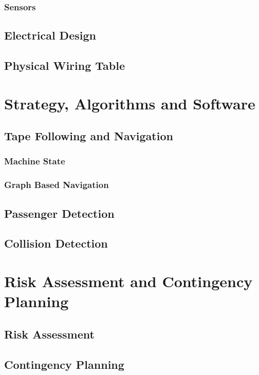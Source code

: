 \documentclass[12pt]{article}
\begin{document}
\subsubsection{Sensors}
\subsection{Electrical Design}
\subsection{Physical Wiring Table}

\section{Strategy, Algorithms and Software}
\subsection{Tape Following and Navigation}
\subsubsection{Machine State}
\subsubsection{Graph Based Navigation}
\subsection{Passenger Detection}
\subsection{Collision Detection}

\section{Risk Assessment and Contingency Planning}
\subsection{Risk Assessment}
\subsection{Contingency Planning}
\hspace*{-5pt}
\end{document}
